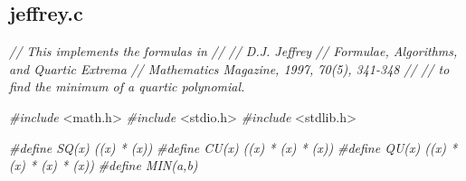 \documentclass[
  12pt,
]{book}
\newenvironment{Shaded}{\begin{snugshade}}{\end{snugshade}}
\newcommand{\CommentTok}[1]{\textcolor[rgb]{0.56,0.35,0.01}{\textit{#1}}}
\newcommand{\ImportTok}[1]{#1}
\newcommand{\PreprocessorTok}[1]{\textcolor[rgb]{0.56,0.35,0.01}{\textit{#1}}}
\theoremstyle{definition}
\theoremstyle{definition}
\theoremstyle{definition}
\theoremstyle{definition}
\theoremstyle{remark}
\begin{document}
\hypertarget{jeffrey.c}{%
\subsection{jeffrey.c}\label{jeffrey.c}}

\begin{Shaded}
\begin{Highlighting}[]
\CommentTok{// This implements the formulas in}
\CommentTok{//}
\CommentTok{// D.J. Jeffrey}
\CommentTok{// Formulae, Algorithms, and Quartic Extrema}
\CommentTok{// Mathematics Magazine, 1997, 70(5), 341{-}348}
\CommentTok{//}
\CommentTok{// to find the minimum of a quartic polynomial.}

\PreprocessorTok{\#include }\ImportTok{\textless{}math.h\textgreater{}}
\PreprocessorTok{\#include }\ImportTok{\textless{}stdio.h\textgreater{}}
\PreprocessorTok{\#include }\ImportTok{\textless{}stdlib.h\textgreater{}}

\PreprocessorTok{\#define SQ(x) ((x) * (x))}
\PreprocessorTok{\#define CU(x) ((x) * (x) * (x))}
\PreprocessorTok{\#define QU(x) ((x) * (x) * (x) * (x))}
\PreprocessorTok{\#define MIN(a,b)}


\end{Highlighting}
\end{Shaded}
\end{document}
